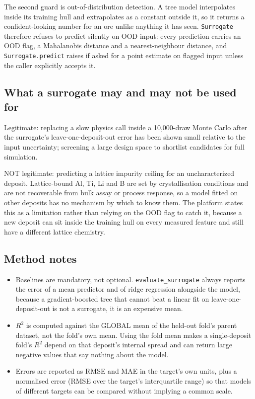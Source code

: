 \documentclass[10pt,a4paper,twoside]{report}
\begin{document}
The second guard is out-of-distribution detection. A tree model interpolates inside its training hull and extrapolates as a constant outside it, so it returns a confident-looking number for an ore unlike anything it has seen. \texttt{Surrogate} therefore refuses to predict silently on OOD input: every prediction carries an OOD flag, a Mahalanobis distance and a nearest-neighbour distance, and \texttt{Surrogate.predict} raises if asked for a point estimate on flagged input unless the caller explicitly accepts it.

\subsection*{What a surrogate may and may not be used for}

Legitimate: replacing a slow physics call inside a 10,000-draw Monte Carlo after the surrogate's leave-one-deposit-out error has been shown small relative to the input uncertainty; screening a large design space to shortlist candidates for full simulation.

NOT legitimate: predicting a lattice impurity ceiling for an uncharacterized deposit. Lattice-bound Al, Ti, Li and B are set by crystallisation conditions and are not recoverable from bulk assay or process response, so a model fitted on other deposits has no mechanism by which to know them. The platform states this as a limitation rather than relying on the OOD flag to catch it, because a new deposit can sit inside the training hull on every measured feature and still have a different lattice chemistry.

\subsection*{Method notes}

\begin{itemize}
\item Baselines are mandatory, not optional. \texttt{evaluate\_surrogate} always reports the error of a mean predictor and of ridge regression alongside the model, because a gradient-boosted tree that cannot beat a linear fit on leave-one-deposit-out is not a surrogate, it is an expensive mean.
\item $R^2$ is computed against the GLOBAL mean of the held-out fold's parent dataset, not the fold's own mean. Using the fold mean makes a single-deposit fold's $R^2$ depend on that deposit's internal spread and can return large negative values that say nothing about the model.
\item Errors are reported as RMSE and MAE in the target's own units, plus a normalised error (RMSE over the target's interquartile range) so that models of different targets can be compared without implying a common scale.
\end{itemize}
\end{document}
